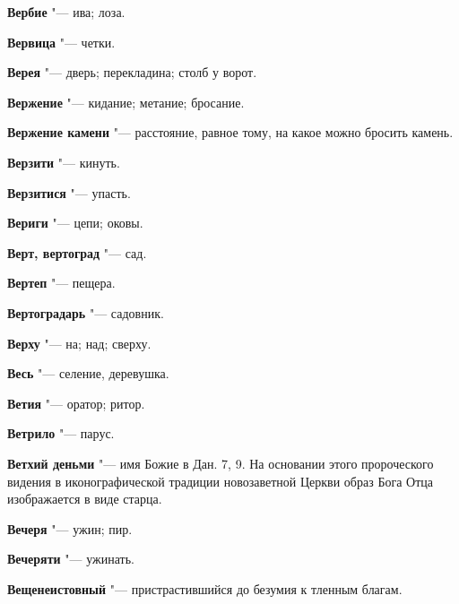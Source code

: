 \begin{mymulticols}{2}
\noindent\textbf{Вербие} "--- ива; лоза. 




\noindent\textbf{Вервица} "--- четки. 




\noindent\textbf{Верея} "--- дверь; перекладина; столб у ворот. 




\noindent\textbf{Вержение} "--- кидание; метание; бросание. 




\noindent\textbf{Вержение камени} "--- расстояние, равное тому, на какое можно бросить камень. 




\noindent\textbf{Верзити} "--- кинуть. 




\noindent\textbf{Верзитися} "--- упасть. 




\noindent\textbf{Вериги} "--- цепи; оковы. 




\noindent\textbf{Верт, вертоград} "--- сад. 




\noindent\textbf{Вертеп} "--- пещера. 




\noindent\textbf{Вертоградарь} "--- садовник. 




\noindent\textbf{Верху} "--- на; над; сверху. 




\noindent\textbf{Весь} "--- селение, деревушка. 




\noindent\textbf{Ветия} "--- оратор; ритор. 




\noindent\textbf{Ветрило} "--- парус. 




\noindent\textbf{Ветхий деньми} "--- имя Божие в Дан. 7, 9. На основании этого пророческого видения в иконографической традиции новозаветной Церкви образ Бога Отца изображается в виде старца. 




\noindent\textbf{Вечеря} "--- ужин; пир. 




\noindent\textbf{Вечеряти} "--- ужинать. 




\noindent\textbf{Вещенеистовный} "--- пристрастившийся до безумия к тленным благам. 





\end{mymulticols}
